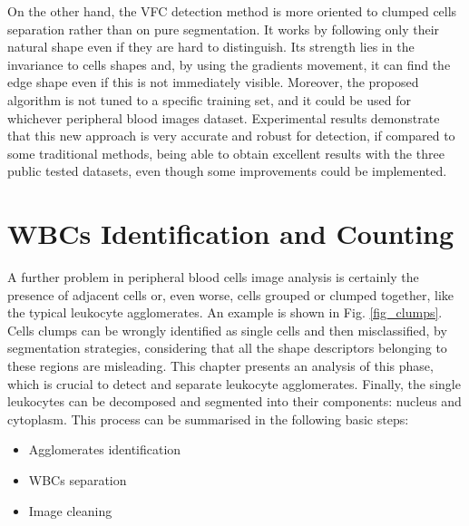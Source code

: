 {	On the other hand, the VFC detection method is more oriented to clumped cells separation rather than on pure segmentation. It works by following only their natural shape even if they are hard to distinguish. Its strength lies in the invariance to cells shapes and, by using the gradients movement, it can find the edge shape even if this is not immediately visible.
	Moreover, the proposed algorithm is not tuned to a specific training set, and it could be used for whichever peripheral blood images dataset. 
	Experimental results demonstrate that this new approach is very accurate and robust for detection, if compared to some traditional methods, being able to obtain excellent results with the three public tested datasets, even though some improvements could be implemented.
	
	\chapter{WBCs Identification and Counting} 
	A further problem in peripheral blood cells image analysis is certainly the presence of adjacent cells or, even worse, cells grouped or clumped together, like the typical leukocyte agglomerates. An example is shown in Fig. \ref{fig_clumps}. Cells clumps can be wrongly identified as single cells and then misclassified, by segmentation strategies, considering that all the shape descriptors belonging to these regions are misleading. 
	This chapter presents an analysis of this phase, which is crucial to detect and separate leukocyte agglomerates. Finally, the single leukocytes can be decomposed and segmented into their components: nucleus and cytoplasm. This process can be summarised in the following basic steps:
	\begin{itemize}
		\item Agglomerates identification 
		\item WBCs separation
		\item Image cleaning
	\end{itemize}
	
}
